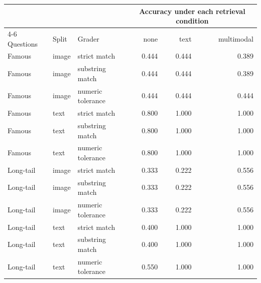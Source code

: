 \begin{tabular}{lllrrr}
\toprule
& & & \multicolumn{3}{c}{Accuracy under each retrieval condition} \\
\cmidrule(lr){4-6}
Questions & Split & Grader & none & text & multimodal \\
\midrule
Famous & image & strict match & 0.444 & 0.444 & 0.389 \\
Famous & image & substring match & 0.444 & 0.444 & 0.389 \\
Famous & image & numeric tolerance & 0.444 & 0.444 & 0.444 \\
Famous & text & strict match & 0.800 & 1.000 & 1.000 \\
Famous & text & substring match & 0.800 & 1.000 & 1.000 \\
Famous & text & numeric tolerance & 0.800 & 1.000 & 1.000 \\
Long-tail & image & strict match & 0.333 & 0.222 & 0.556 \\
Long-tail & image & substring match & 0.333 & 0.222 & 0.556 \\
Long-tail & image & numeric tolerance & 0.333 & 0.222 & 0.556 \\
Long-tail & text & strict match & 0.400 & 1.000 & 1.000 \\
Long-tail & text & substring match & 0.400 & 1.000 & 1.000 \\
Long-tail & text & numeric tolerance & 0.550 & 1.000 & 1.000 \\
\bottomrule
\end{tabular}
